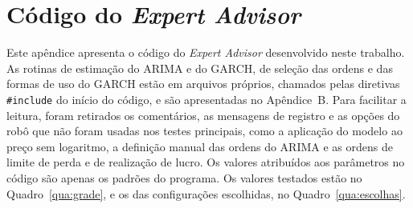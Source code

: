 \chapter{Código do \textit{Expert Advisor}}

Este apêndice apresenta o código do \textit{Expert Advisor} desenvolvido neste
trabalho. As rotinas de estimação do ARIMA e do GARCH, de seleção das ordens e
das formas de uso do GARCH estão em arquivos próprios, chamados pelas diretivas
\texttt{\#include} do início do código, e são apresentadas no Apêndice~B. Para facilitar a leitura, foram retirados os
comentários, as mensagens de registro e as opções do robô que não foram usadas
nos testes principais, como a aplicação do modelo ao preço sem logaritmo, a definição
manual das ordens do ARIMA e as ordens de limite de perda e de realização de
lucro. Os valores atribuídos aos parâmetros no código são apenas os padrões do
programa. Os valores testados estão no Quadro~\ref{qua:grade}, e os das
configurações escolhidas, no Quadro~\ref{qua:escolhas}.


